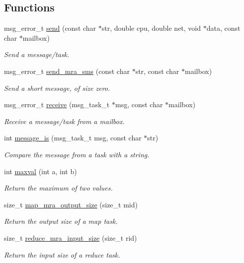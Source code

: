 \subsection*{\-Functions}
\begin{DoxyCompactItemize}
\item 
msg\-\_\-error\-\_\-t \hyperlink{common-mra_8h_a385b12669d8faf7b5cdb54c1ae597e1c}{send} (const char $\ast$str, double cpu, double net, void $\ast$data, const char $\ast$mailbox)
\begin{DoxyCompactList}\small\item\em \-Send a message/task. \end{DoxyCompactList}\item 
msg\-\_\-error\-\_\-t \hyperlink{common-mra_8h_a305ac8e3389f94106990aa3c52c91416}{send\-\_\-mra\-\_\-sms} (const char $\ast$str, const char $\ast$mailbox)
\begin{DoxyCompactList}\small\item\em \-Send a short message, of size zero. \end{DoxyCompactList}\item 
msg\-\_\-error\-\_\-t \hyperlink{common-mra_8h_a6fc60933b9eabe64a880f68eba3131cc}{receive} (msg\-\_\-task\-\_\-t $\ast$msg, const char $\ast$mailbox)
\begin{DoxyCompactList}\small\item\em \-Receive a message/task from a mailbox. \end{DoxyCompactList}\item 
int \hyperlink{common-mra_8h_ad37a02c988c597622a346cb5293243fb}{message\-\_\-is} (msg\-\_\-task\-\_\-t msg, const char $\ast$str)
\begin{DoxyCompactList}\small\item\em \-Compare the message from a task with a string. \end{DoxyCompactList}\item 
int \hyperlink{common-mra_8h_a411d5133ab6881d40ef4cb44a7a47428}{maxval} (int a, int b)
\begin{DoxyCompactList}\small\item\em \-Return the maximum of two values. \end{DoxyCompactList}\item 
size\-\_\-t \hyperlink{common-mra_8h_a1df0d355a0754a40a7697437294d8431}{map\-\_\-mra\-\_\-output\-\_\-size} (size\-\_\-t mid)
\begin{DoxyCompactList}\small\item\em \-Return the output size of a map task. \end{DoxyCompactList}\item 
size\-\_\-t \hyperlink{common-mra_8h_a8205e98d4874b7e31f138d5016ad1eba}{reduce\-\_\-mra\-\_\-input\-\_\-size} (size\-\_\-t rid)
\begin{DoxyCompactList}\small\item\em \-Return the input size of a reduce task. \end{DoxyCompactList}\end{DoxyCompactItemize}
